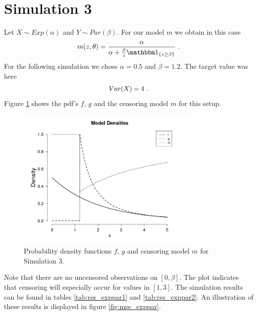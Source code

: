 \section{Simulation 3} \label{sec:sim_exppar}
Let $X \sim Exp(\alpha)$ and $Y \sim Par(\beta)$. For our model $m$ we obtain in this case
$$m(z,\theta) = \frac{\alpha}{\alpha + \frac{\beta}{z}\I{z \geq \beta}}\mdot$$
For the following simulation we chose $\alpha = 0.5$ and $\beta = 1.2$. The target value was here
$$Var(X) = 4\textrm{ .}$$
Figure \ref{fig:dens_exppar} shows the pdf's $f$, $g$ and the censoring model $m$ for this setup.
\clearpage
\begin{figure}[h!]
	\begin{center}
		\includegraphics[width=0.8\textwidth]{./figures/exppar_dens}
	\end{center}
	\caption{Probability density functions $f$, $g$ and censoring model $m$ for Simulation 3.}
	\label{fig:dens_exppar}
\end{figure}
%
Note that there are no uncensored observations on $[0,\beta]$. The plot indicates that censoring will especially occur for values in $[1,3]$.
%
The simulation results can be found in tables \ref{tab:res_exppar1} and \ref{tab:res_exppar2}. An illustration of these results is displayed in figure \ref{fig:mse_exppar}.
